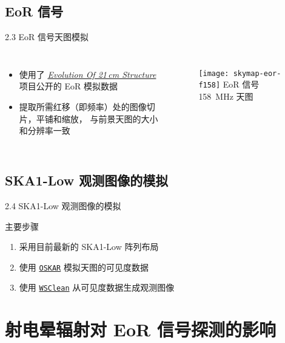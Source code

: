 \documentclass{beamer}
\begin{document}
\subsection{EoR 信号}

\begin{frame}{2.3 EoR 信号天图模拟}
  \begin{columns}
    \begin{itemize}
      \item 使用了 \href{http://homepage.sns.it/mesinger/EOS.html}{\textit{Evolution Of 21\,cm Structure}}
        项目公开的 EoR 模拟数据
      \item 提取所需红移（即频率）处的图像切片，平铺和缩放，
        与前景天图的大小和分辨率一致
    \end{itemize}

    \begin{figure}
      \centering\footnotesize
      \texttt{[image: skymap-eor-f158]}
      EoR 信号 \SI{158}{\MHz} 天图
    \end{figure}
  \end{columns}
\end{frame}

\subsection{SKA1-Low 观测图像的模拟}

\begin{frame}{2.4 SKA1-Low 观测图像的模拟}
  \begin{alertblock}{主要步骤}
  \begin{enumerate}
    \item 采用目前最新的 \alert{SKA1-Low 阵列布局}
    \item 使用 \href{https://github.com/OxfordSKA/OSKAR}{\texttt{OSKAR}}
      模拟天图的\alert{可见度数据}
    \item 使用 \href{https://sourceforge.net/projects/wsclean/}{\texttt{WSClean}}
      从可见度数据生成\alert{观测图像}
  \end{enumerate}
  \end{alertblock}
\end{frame}


\section{射电晕辐射对 EoR 信号探测的影响}
\end{document}
